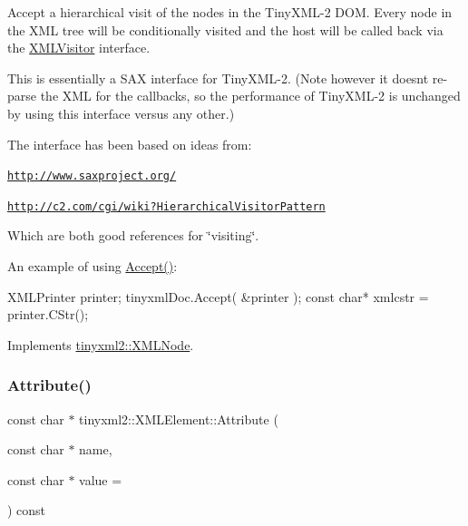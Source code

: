 Accept a hierarchical visit of the nodes in the Tiny\+X\+M\+L-\/2 D\+OM. Every node in the X\+ML tree will be conditionally visited and the host will be called back via the \mbox{\hyperlink{classtinyxml2_1_1_x_m_l_visitor}{X\+M\+L\+Visitor}} interface.

This is essentially a S\+AX interface for Tiny\+X\+M\+L-\/2. (Note however it doesn\textquotesingle{}t re-\/parse the X\+ML for the callbacks, so the performance of Tiny\+X\+M\+L-\/2 is unchanged by using this interface versus any other.)

The interface has been based on ideas from\+:


\begin{DoxyItemize}
\item \href{http://www.saxproject.org/}{\tt http\+://www.\+saxproject.\+org/}
\item \href{http://c2.com/cgi/wiki?HierarchicalVisitorPattern}{\tt http\+://c2.\+com/cgi/wiki?\+Hierarchical\+Visitor\+Pattern}
\end{DoxyItemize}

Which are both good references for \char`\"{}visiting\char`\"{}.

An example of using \mbox{\hyperlink{classtinyxml2_1_1_x_m_l_element_a9b2119831e8b85827d5d3e5076788e4a}{Accept()}}\+: \begin{DoxyVerb}XMLPrinter printer;
tinyxmlDoc.Accept( &printer );
const char* xmlcstr = printer.CStr();
\end{DoxyVerb}
 

Implements \mbox{\hyperlink{classtinyxml2_1_1_x_m_l_node_a81e66df0a44c67a7af17f3b77a152785}{tinyxml2\+::\+X\+M\+L\+Node}}.

\mbox{\label{classtinyxml2_1_1_x_m_l_element_a48cf4a315cfbac7d74cd0d5ff2c5df51}} 
\subsubsection{\texorpdfstring{Attribute()}{Attribute()}}
{\footnotesize\ttfamily const char $\ast$ tinyxml2\+::\+X\+M\+L\+Element\+::\+Attribute (\begin{DoxyParamCaption}\item[{const char $\ast$}]{name,  }\item[{const char $\ast$}]{value = {} }\end{DoxyParamCaption}) const}

